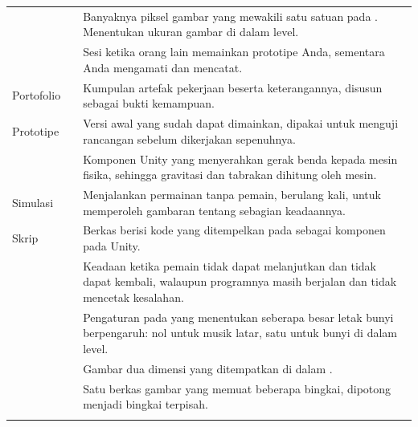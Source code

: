 \begin{longtable}{@{}L{3.9cm} L{3.6cm} L{7.2cm}@{}}
 &  &
Banyaknya piksel gambar yang mewakili satu satuan pada .
Menentukan ukuran gambar di dalam level. \\ \addlinespace

 &  &
Sesi ketika orang lain memainkan prototipe Anda, sementara Anda mengamati dan
mencatat. \\ \addlinespace

Portofolio &  &
Kumpulan artefak pekerjaan beserta keterangannya, disusun sebagai bukti
kemampuan. \\ \addlinespace

Prototipe &  &
Versi awal yang sudah dapat dimainkan, dipakai untuk menguji rancangan sebelum
dikerjakan sepenuhnya. \\ \addlinespace

 &  &
Komponen Unity yang menyerahkan gerak benda kepada mesin fisika, sehingga
gravitasi dan tabrakan dihitung oleh mesin. \\ \addlinespace

Simulasi &  &
Menjalankan permainan tanpa pemain, berulang kali, untuk memperoleh gambaran
tentang sebagian keadaannya. \\ \addlinespace

Skrip &  &
Berkas berisi kode yang ditempelkan pada  sebagai komponen
pada Unity. \\ \addlinespace

 &  &
Keadaan ketika pemain tidak dapat melanjutkan dan tidak dapat kembali,
walaupun programnya masih berjalan dan tidak mencetak kesalahan. \\
\addlinespace

 &  &
Pengaturan pada  yang menentukan seberapa besar letak bunyi
berpengaruh: nol untuk musik latar, satu untuk bunyi di dalam level. \\
\addlinespace

 &  &
Gambar dua dimensi yang ditempatkan di dalam . \\
\addlinespace

 &  &
Satu berkas gambar yang memuat beberapa bingkai, dipotong menjadi bingkai
terpisah. \\ \addlinespace


\end{longtable}
